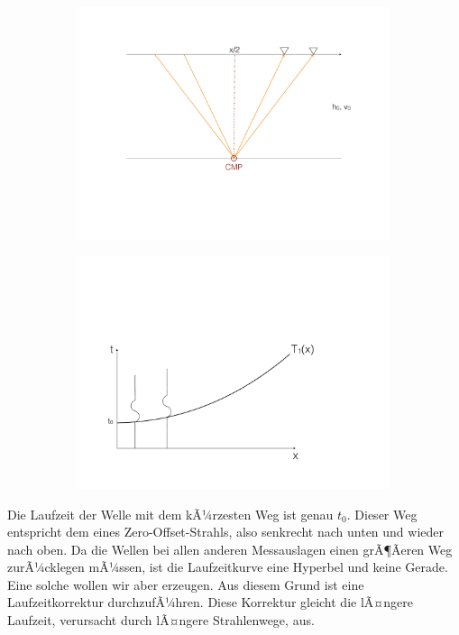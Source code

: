 \begin{figure}[H]
	\begin{subfigure}[m]{0.5\textwidth}
	\centering
		\includegraphics[scale = 0.2]{ReflexionsseismikBilder/CMPSortierung}	
	\end{subfigure}
	\begin{subfigure}[m]{0.5\textwidth}
	\centering
		\includegraphics[scale = 0.2]{ReflexionsseismikBilder/LaufzeitCMP}
	\end{subfigure}
\end{figure}


Die Laufzeit der Welle mit dem kÃ¼rzesten Weg ist genau $t_0$. Dieser Weg entspricht dem eines Zero-Offset-Strahls, also senkrecht nach unten und wieder nach oben.
Da die Wellen bei allen anderen Messauslagen einen grÃ¶Ãeren Weg zurÃ¼cklegen mÃ¼ssen, ist die Laufzeitkurve eine Hyperbel und keine Gerade. Eine solche wollen wir aber erzeugen. Aus diesem Grund ist eine Laufzeitkorrektur durchzufÃ¼hren. Diese Korrektur gleicht die lÃ¤ngere Laufzeit, verursacht durch lÃ¤ngere Strahlenwege, aus. 


